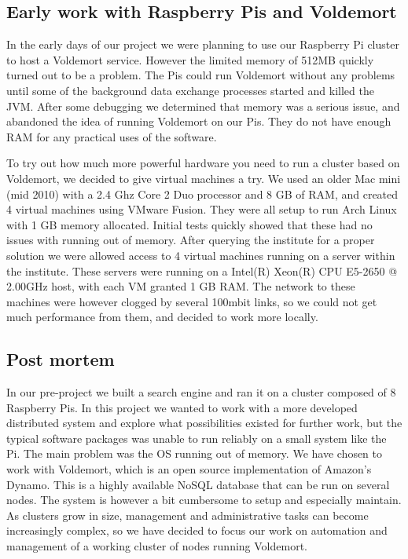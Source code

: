 \subsection*{Early work with Raspberry Pis and Voldemort}
In the early days of our project we were planning to use our Raspberry Pi cluster to host a Voldemort service. However the limited memory of 512MB quickly turned out to be a problem. The Pis could run Voldemort without any problems until some of the background data exchange processes started and killed the JVM. After some debugging we determined that memory was a serious issue, and abandoned the idea of running Voldemort on our Pis. They do not have enough RAM for any practical uses of the software.

To try out how much more powerful hardware you need to run a cluster based on Voldemort, we decided to give virtual machines a try. We used an older Mac mini (mid 2010) with a 2.4 Ghz Core 2 Duo processor and 8 GB of RAM, and created 4 virtual machines using VMware Fusion. They were all setup to run Arch Linux with 1 GB memory allocated. Initial tests quickly showed that these had no issues with running out of memory. After querying the institute for a proper solution we were allowed access to 4 virtual machines running on a server within the institute. These servers were running on a Intel(R) Xeon(R) CPU E5-2650 @ 2.00GHz host, with each VM granted 1 GB RAM. The network to these machines were however clogged by several 100mbit links, so we could not get much performance from them, and decided to work more locally.

\subsection{Post mortem}
In our pre-project we built a search engine and ran it on a cluster composed of 8 Raspberry Pis. In this project we wanted to work with a more developed distributed system and explore what possibilities existed for further work, but the typical software packages was unable to run reliably on a small system like the Pi. The main problem was the OS running out of memory.
We have chosen to work with Voldemort, which is an open source implementation of Amazon’s Dynamo. This is a highly available NoSQL database that can be run on several nodes. The system is however a bit cumbersome to setup and especially maintain.
As clusters grow in size, management and administrative tasks can become increasingly complex, so we have decided to focus our work on automation and management of a working cluster of nodes running Voldemort. 
